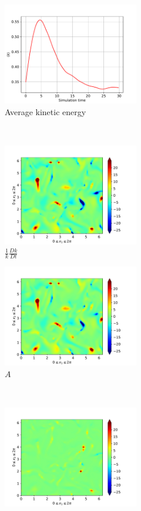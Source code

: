 \newpage

\begin{figure}[H]
    \begin{subfigure}[H]{0.45\textwidth}
        \includegraphics[height=1.75in]{media/run-cds-65/ke-average1335}
        \caption{Average kinetic energy}
    \end{subfigure}
    ~
    \begin{subfigure}[H]{0.45\textwidth}
        \includegraphics[height=1.75in]{media/run-cds-65/ke-1335}
        \caption{$\frac{1}{k} \frac{D k}{Dt}$}
    \end{subfigure}
    \newline
    \begin{subfigure}{0.45\textwidth}
        \includegraphics[height=1.75in]{media/run-cds-65/A-ke-1335}
        \caption{$A$}
    \end{subfigure}
    ~
    \begin{subfigure}{0.45\textwidth}
        \includegraphics[height=1.75in]{media/run-cds-65/C-ke-1335}

\end{subfigure}
\end{figure}
